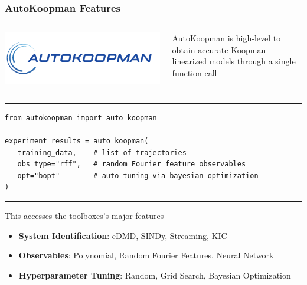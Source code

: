 \documentclass[shortpres,aspectratio=43]{beamer}
\begin{document}
\begin{frame}[fragile]
\frametitle{AutoKoopman Features}

\begin{columns}
    \begin{column}{0.4\linewidth}
    \begin{center}
    \includegraphics[width=\linewidth]{./img/logo-full.pdf}
    \end{center}
    \end{column}
    \begin{column}{0.6\linewidth}
AutoKoopman is high-level to obtain accurate Koopman linearized models through a single function call
    \end{column}
\end{columns}

\rule{\textwidth}{1pt}
\begin{scriptsize}
\begin{verbatim}
from autokoopman import auto_koopman

experiment_results = auto_koopman(
   training_data,    # list of trajectories
   obs_type="rff",   # random Fourier feature observables
   opt="bopt"        # auto-tuning via bayesian optimization
)      
\end{verbatim}
\end{scriptsize}
\rule{\textwidth}{1pt}

This accesses the toolboxes's major features
\begin{itemize}
	\item \textbf{System Identification}: eDMD, SINDy, Streaming, KIC
	\item \textbf{Observables}: Polynomial, Random Fourier Features, Neural Network
	\item \textbf{Hyperparameter Tuning}: Random, Grid Search, Bayesian Optimization
\end{itemize}


\end{frame}
\end{document}
